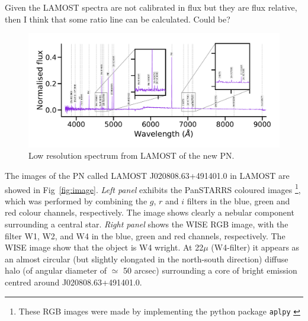 \documentclass[twocolumn]{article}
\begin{document}
Given the LAMOST spectra
are not calibrated in flux but they are flux relative, then I think that some ratio line can be calculated. Could be?

\begin{figure}
\centering
  \includegraphics[width=0.9\linewidth]{../Spectra-lamostdr7/spec-56581-VB031N50V1_sp08-218.pdf}
  \caption{Low resolution spectrum from LAMOST of the new PN.} 
  \label{fig:spectra}
\end{figure}

The images of the PN called LAMOST J020808.63+491401.0 in LAMOST are showed
in Fig~\ref{fig:image}.
\textit{Left panel} exhibits the PanSTARRS coloured
images \footnote{These RGB images were made by implementing
the python package \texttt{aplpy} \citep{aplpy:2019}}, which
was performed by combining the $g$, $r$ and $i$ filters in
the blue, green and red colour channels, respectively.
The image shows clearly a nebular component surrounding 
a central star. \textit{Right panel} shows the
WISE RGB image, with the filter W1, W2, and W4 in
the blue, green and red channels, respectively.
 The WISE image show that the object is W4 wright.
At 22$\mu$ (W4-filter) it appears as an almost
circular (but slightly elongated in the north-south direction)
diffuse halo (of angular diameter of $\simeq$ 50 arcsec) surrounding
a core of bright emission centred around  J020808.63+491401.0. 
\end{document}
